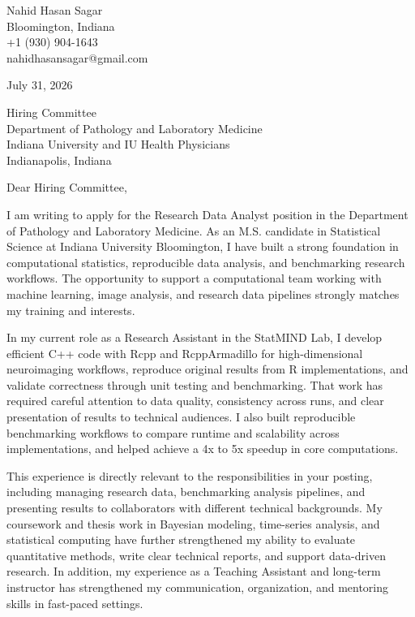\documentclass[10pt,letterpaper]{article}
\begin{document}
\begin{flushleft}
Nahid Hasan Sagar\\
Bloomington, Indiana\\
+1 (930) 904-1643\\
nahidhasansagar@gmail.com
\end{flushleft}

July 31, 2026

Hiring Committee\\
Department of Pathology and Laboratory Medicine\\
Indiana University and IU Health Physicians\\
Indianapolis, Indiana

Dear Hiring Committee,

I am writing to apply for the Research Data Analyst position in the Department of Pathology and Laboratory Medicine. As an M.S. candidate in Statistical Science at Indiana University Bloomington, I have built a strong foundation in computational statistics, reproducible data analysis, and benchmarking research workflows. The opportunity to support a computational team working with machine learning, image analysis, and research data pipelines strongly matches my training and interests.

In my current role as a Research Assistant in the StatMIND Lab, I develop efficient C++ code with Rcpp and RcppArmadillo for high-dimensional neuroimaging workflows, reproduce original results from R implementations, and validate correctness through unit testing and benchmarking. That work has required careful attention to data quality, consistency across runs, and clear presentation of results to technical audiences. I also built reproducible benchmarking workflows to compare runtime and scalability across implementations, and helped achieve a 4x to 5x speedup in core computations.

This experience is directly relevant to the responsibilities in your posting, including managing research data, benchmarking analysis pipelines, and presenting results to collaborators with different technical backgrounds. My coursework and thesis work in Bayesian modeling, time-series analysis, and statistical computing have further strengthened my ability to evaluate quantitative methods, write clear technical reports, and support data-driven research. In addition, my experience as a Teaching Assistant and long-term instructor has strengthened my communication, organization, and mentoring skills in fast-paced settings.
\end{document}

